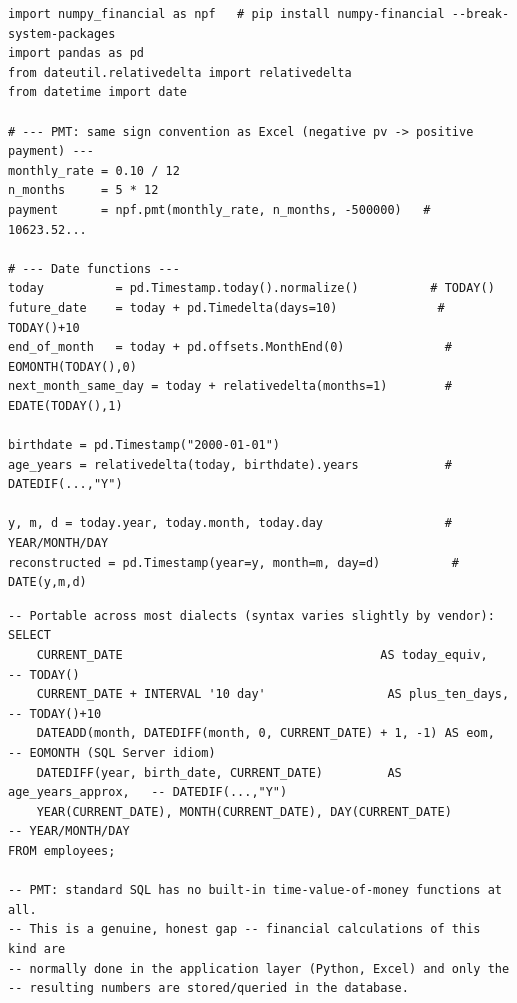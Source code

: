 \documentclass[11pt,a4paper]{article}
\begin{document}
\begin{lstlisting}[style=pythonstyle, caption={PMT via numpy\_financial (NumPy itself dropped its financial functions), and the date-function family via pandas/datetime}]
import numpy_financial as npf   # pip install numpy-financial --break-system-packages
import pandas as pd
from dateutil.relativedelta import relativedelta
from datetime import date

# --- PMT: same sign convention as Excel (negative pv -> positive payment) ---
monthly_rate = 0.10 / 12
n_months     = 5 * 12
payment      = npf.pmt(monthly_rate, n_months, -500000)   # 10623.52...

# --- Date functions ---
today          = pd.Timestamp.today().normalize()          # TODAY()
future_date    = today + pd.Timedelta(days=10)              # TODAY()+10
end_of_month   = today + pd.offsets.MonthEnd(0)              # EOMONTH(TODAY(),0)
next_month_same_day = today + relativedelta(months=1)        # EDATE(TODAY(),1)

birthdate = pd.Timestamp("2000-01-01")
age_years = relativedelta(today, birthdate).years            # DATEDIF(...,"Y")

y, m, d = today.year, today.month, today.day                 # YEAR/MONTH/DAY
reconstructed = pd.Timestamp(year=y, month=m, day=d)          # DATE(y,m,d)
\end{lstlisting}

\begin{lstlisting}[style=sqlstyle, caption={Date functions across common SQL dialects, and the honest gap for PMT}]
-- Portable across most dialects (syntax varies slightly by vendor):
SELECT
    CURRENT_DATE                                    AS today_equiv,        -- TODAY()
    CURRENT_DATE + INTERVAL '10 day'                 AS plus_ten_days,      -- TODAY()+10
    DATEADD(month, DATEDIFF(month, 0, CURRENT_DATE) + 1, -1) AS eom,        -- EOMONTH (SQL Server idiom)
    DATEDIFF(year, birth_date, CURRENT_DATE)         AS age_years_approx,   -- DATEDIF(...,"Y")
    YEAR(CURRENT_DATE), MONTH(CURRENT_DATE), DAY(CURRENT_DATE)              -- YEAR/MONTH/DAY
FROM employees;

-- PMT: standard SQL has no built-in time-value-of-money functions at all.
-- This is a genuine, honest gap -- financial calculations of this kind are
-- normally done in the application layer (Python, Excel) and only the
-- resulting numbers are stored/queried in the database.
\end{lstlisting}

\end{document}
